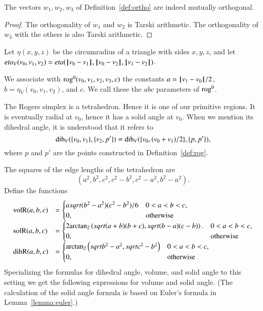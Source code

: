 \begin{lemma} The vectors $w_1,w_2,w_3$ of Definition~\ref{def:ortho}
are indeed mutually orthogonal.
\end{lemma}

\begin{proof} The orthogonality of $w_1$ and $w_2$ is 
Tarski arithmetic.  The orthogonality of $w_3$ with the
others is also Tarski arithmetic.
\end{proof}

\begin{definition}\label{def:etaV}
Let $\eta(x,y,z)$ be the circumradius of a triangle with sides
$x,y,z$, and let $eta_V(v_0,v_1,v_2) = eta({\hskip0.1em|\hskip-0.15em|\hskip0.1em}v_0 - v_1{\hskip0.1em|\hskip-0.15em|\hskip0.1em},{\hskip0.1em|\hskip-0.15em|\hskip0.1em}v_0 - v_2{\hskip0.1em|\hskip-0.15em|\hskip0.1em},{\hskip0.1em|\hskip-0.15em|\hskip0.1em}v_1 - v_2{\hskip0.1em|\hskip-0.15em|\hskip0.1em})$.
\end{definition}

\begin{definition}
We associate with ${\operatorname{rog}}^0(v_0,v_1,v_2,v_3,c)$ the constants
$a={\hskip0.1em|\hskip-0.15em|\hskip0.1em}v_1 - v_0{\hskip0.1em|\hskip-0.15em|\hskip0.1em}/2$, $b=\eta_V(v_0,v_1,v_2)$, and $c$.
We call these the $abc$ parameters of ${\operatorname{rog}}^0$. 
\end{definition}

The Rogers simplex is a tetrahedron.  Hence it is one of our
primitive regions.  It is eventually radial at $v_0$, hence
it has a solid angle at $v_0$.  When we mention its dihedral
angle, it is understood that it refers to 
   $$
   \operatorname{dih}_V(\{v_0,v_1\},\{v_2,p'\})=\operatorname{dih}_V(\{v_0,(v_0+v_1)/2\},\{p,p'\}),
   $$
where $p$ and $p'$ are the points 
constructed in Definition~\ref{def:rog}.

The squares of the edge lengths of the tetrahedron are
   $$
   (a^2,b^2,c^2,c^2-b^2,c^2-a^2,b^2-a^2).
   $$
Define the functions
   $$
   \begin{array}{lll}
     {\operatorname{volR}}(a,b,c) &= \begin{cases}
       asqrt{(b^2-a^2)(c^2-b^2)}/6& 0 < a < b < c,\\
       0,&\text{otherwise}
       \end{cases}\\
     {\operatorname{solR}}(a,b,c) &= \begin{cases}
      2 {\operatorname{arctan_2}}\left(sqrt{{(a+b)(b+c)}},
         sqrt{{(b-a) (c-b)}}\right).& 0 < a < b < c,\\
      0,&\text{otherwise}
     \end{cases}\\
     {\operatorname{dihR}}(a,b,c) &= \begin{cases}
      {\operatorname{arctan\ensuremath{_2}}}\left(sqrt{b^2 - a^2},sqrt{c^2 - b^2}\right)
      & 0 < a < b < c,\\
      0,&\text{otherwise}
     \end{cases}
     \end{array}
   $$
Specializing the formulas for dihedral angle, volume, and solid angle to this
setting we get the following expressions for volume and solid angle.
(The calculation of the
 solid angle formula is based on Euler's formula in 
Lemma~\ref{lemma:euler}.)

